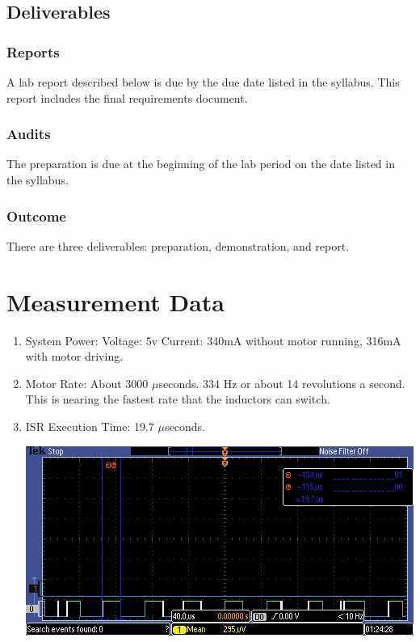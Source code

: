 \documentclass[twoside]{article}
\begin{document}
\subsection*{Deliverables}
\subsubsection*{Reports}
A lab report described below is due by the due date listed in the syllabus. This report includes the final requirements document.
\subsubsection*{Audits}
The preparation is due at the beginning of the lab period on the date listed in the syllabus.
\subsubsection*{Outcome}
There are three deliverables: preparation, demonstration, and report.

\section*{Measurement Data}
\begin{enumerate}
\item System Power: 
\subitem Voltage: 5v 
\subitem Current: 340mA without motor running, 316mA with motor driving.
\item Motor Rate: About 3000 $\mu$seconds. 334 Hz or about 14 revolutions a second. This is nearing the fastest rate that the inductors can switch.
\item ISR Execution Time: 19.7 $\mu$seconds.\\
\centerline{\includegraphics[width=1\textwidth]{TEK00000}}
\end{enumerate}
\end{document}
